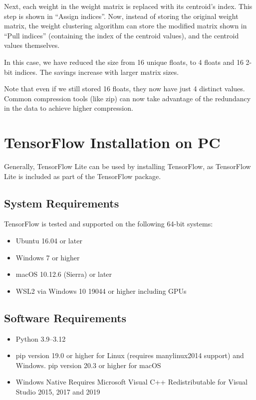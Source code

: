Next, each weight in the weight matrix is replaced with its centroid’s index. This step is shown in “Assign indices”. Now, instead of storing the original weight matrix, the weight clustering algorithm can store the modified matrix shown in “Pull indices” (containing the index of the centroid values), and the centroid values themselves.

In this case, we have reduced the size from 16 unique floats, to 4 floats and 16 2-bit indices. The savings increase with larger matrix sizes.

Note that even if we still stored 16 floats, they now have just 4 distinct values. Common compression tools (like zip) can now take advantage of the redundancy in the data to achieve higher compression. \cite{tfBlog_ClusteringOpt:2021} \cite{BlogPaperOpt:2017}

\chapter{TensorFlow Installation on PC}
\label{tf_install}
Generally, TensorFlow Lite can be used by installing TensorFlow, as TensorFlow Lite is included as part of the TensorFlow package.

\section{System Requirements}
TensorFlow is tested and supported on the following 64-bit systems: \cite{tflInstallation:2024}
\begin{itemize}
	\item Ubuntu 16.04 or later
	\item Windows 7 or higher
	\item macOS 10.12.6 (Sierra) or later
	\item WSL2 via Windows 10 19044 or higher including GPUs
\end{itemize}

\section{Software Requirements}
\begin{itemize}
	\item Python 3.9--3.12
	\item pip version 19.0 or higher for Linux (requires manylinux2014 support) and Windows. pip version 20.3 or higher for macOS
	\item Windows Native Requires Microsoft Visual C++ Redistributable for Visual Studio 2015, 2017 and 2019 \cite{tflInstallation:2024}
\end{itemize}


